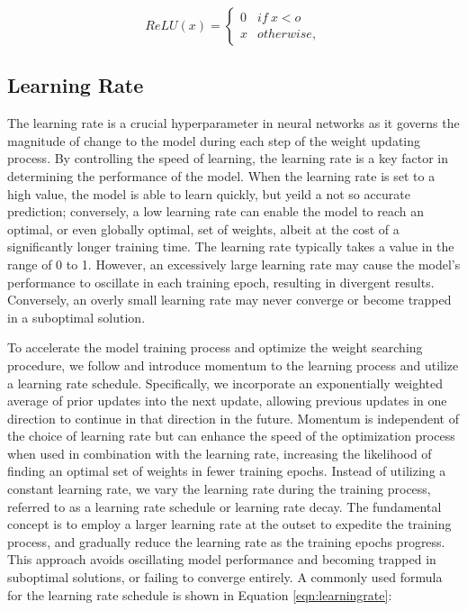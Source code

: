\begin{equation}
  \label{eqn:ReLU}
  ReLU(x) = \begin{cases}
    0 & if \ x < o \\
    x & otherwise,
  \end{cases}
  \end{equation}

\subsection{Learning Rate}

The learning rate is a crucial hyperparameter in neural networks as it governs the magnitude of change to the model during each step of the weight updating process. By controlling the speed of learning, the learning rate is a key factor in determining the performance of the model. When the learning rate is set to a high value, the model is able to learn quickly, but yeild a not so accurate prediction; conversely, a low learning rate can enable the model to reach an optimal, or even globally optimal, set of weights, albeit at the cost of a significantly longer training time. The learning rate typically takes a value in the range of 0 to 1. However, an excessively large learning rate may cause the model's performance to oscillate in each training epoch, resulting in divergent results. Conversely, an overly small learning rate may never converge or become trapped in a suboptimal solution.

To accelerate the model training process and optimize the weight searching procedure, we follow \citet*{smith2017cyclical} and introduce momentum to the learning process and utilize a learning rate schedule. Specifically, we incorporate an exponentially weighted average of prior updates into the next update, allowing previous updates in one direction to continue in that direction in the future. Momentum is independent of the choice of learning rate but can enhance the speed of the optimization process when used in combination with the learning rate, increasing the likelihood of finding an optimal set of weights in fewer training epochs. Instead of utilizing a constant learning rate, we vary the learning rate during the training process, referred to as a learning rate schedule or learning rate decay. The fundamental concept is to employ a larger learning rate at the outset to expedite the training process, and gradually reduce the learning rate as the training epochs progress. This approach avoids oscillating model performance and becoming trapped in suboptimal solutions, or failing to converge entirely. A commonly used formula for the learning rate schedule is shown in Equation \ref{eqn:learningrate}:

